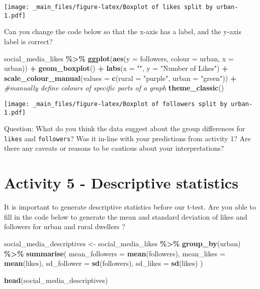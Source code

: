 \documentclass[
]{book}
\newenvironment{Shaded}{\begin{snugshade}}{\end{snugshade}}
\newcommand{\AttributeTok}[1]{\textcolor[rgb]{0.13,0.29,0.53}{#1}}
\newcommand{\CommentTok}[1]{\textcolor[rgb]{0.56,0.35,0.01}{\textit{#1}}}
\newcommand{\FunctionTok}[1]{\textcolor[rgb]{0.13,0.29,0.53}{\textbf{#1}}}
\newcommand{\NormalTok}[1]{#1}
\newcommand{\OtherTok}[1]{\textcolor[rgb]{0.56,0.35,0.01}{#1}}
\newcommand{\SpecialCharTok}[1]{\textcolor[rgb]{0.81,0.36,0.00}{\textbf{#1}}}
\newcommand{\StringTok}[1]{\textcolor[rgb]{0.31,0.60,0.02}{#1}}
\begin{document}
\texttt{[image: \_main\_files/figure-latex/Boxplot of likes split by urban-1.pdf]}

Can you change the code below so that the x-axis has a label, and the y-axis label is correct?

\begin{Shaded}
\begin{Highlighting}[]
\NormalTok{social\_media\_likes }\SpecialCharTok{\%\textgreater{}\%} 
  \FunctionTok{ggplot}\NormalTok{(}\FunctionTok{aes}\NormalTok{(}\AttributeTok{y =}\NormalTok{ followers, }\AttributeTok{colour =}\NormalTok{ urban, }\AttributeTok{x =}\NormalTok{ urban)) }\SpecialCharTok{+}
  \FunctionTok{geom\_boxplot}\NormalTok{() }\SpecialCharTok{+}
  \FunctionTok{labs}\NormalTok{(}\AttributeTok{x =} \StringTok{""}\NormalTok{, }\AttributeTok{y =} \StringTok{"Number of Likes"}\NormalTok{) }\SpecialCharTok{+}
  \FunctionTok{scale\_colour\_manual}\NormalTok{(}\AttributeTok{values =} \FunctionTok{c}\NormalTok{(}\AttributeTok{rural =} \StringTok{"purple"}\NormalTok{, }\AttributeTok{urban =} \StringTok{"green"}\NormalTok{)) }\SpecialCharTok{+} \CommentTok{\#manually define colours of specific parts of a graph}
  \FunctionTok{theme\_classic}\NormalTok{() }
\end{Highlighting}
\end{Shaded}

\texttt{[image: \_main\_files/figure-latex/Boxplot of followers split by urban-1.pdf]}

Question: What do you think the data suggest about the group differences for \texttt{likes} and \texttt{followers}? Was it in-line with your predictions from activity 1? Are there any caveats or reasons to be cautious about your interpretations?

\section{Activity 5 - Descriptive statistics}\label{activity-5---descriptive-statistics}

It is important to generate descriptive statistics before our t-test. Are you able to fill in the code below to generate the mean and standard deviation of likes and followers for urban and rural dwellers ?

\begin{Shaded}
\begin{Highlighting}[]
\NormalTok{social\_media\_descriptives }\OtherTok{\textless{}{-}}\NormalTok{ social\_media\_likes }\SpecialCharTok{\%\textgreater{}\%} 
  \FunctionTok{group\_by}\NormalTok{(urban) }\SpecialCharTok{\%\textgreater{}\%} 
  \FunctionTok{summarise}\NormalTok{(}
    \AttributeTok{mean\_followers =} \FunctionTok{mean}\NormalTok{(followers),}
    \AttributeTok{mean\_likes =} \FunctionTok{mean}\NormalTok{(likes),}
    \AttributeTok{sd\_follower =} \FunctionTok{sd}\NormalTok{(followers),}
    \AttributeTok{sd\_likes =} \FunctionTok{sd}\NormalTok{(likes)}
\NormalTok{  )}

\FunctionTok{head}\NormalTok{(social\_media\_descriptives)}
\end{Highlighting}
\end{Shaded}
\end{document}
